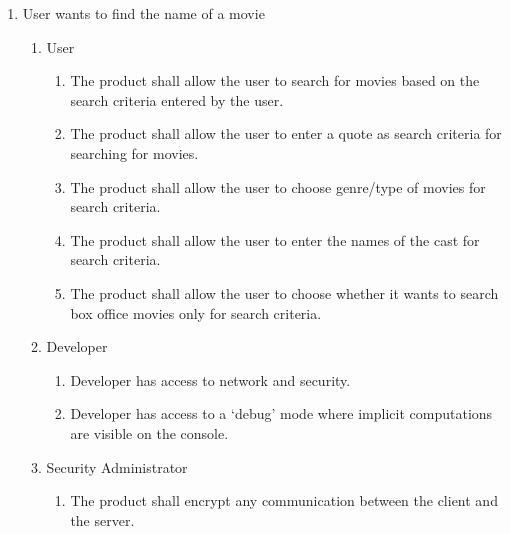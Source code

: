 \documentclass[]{article}
\begin{document}
\begin{enumerate}[{BE}1.]
	
	\item User wants to find the name of a movie
	\begin{enumerate}[{VP1}.1]
		\item User
			\begin{enumerate}
				\item The product shall allow the user to search for movies based on the search criteria entered by the user.
				\item The product shall allow the user to enter a quote as search criteria for searching for movies.
				\item The product shall allow the user to choose genre/type of movies for search criteria.
				\item The product shall allow the user to enter the names of the cast for search criteria.
				\item The product shall allow the user to choose whether it wants to search box office movies only for search criteria.
			\end{enumerate}
		\item Developer
			\begin{enumerate}
				\item Developer has access to network and security.
				\item Developer has access to a ‘debug’ mode where implicit computations are visible on the console.
			\end{enumerate}
		\item Security Administrator
			\begin{enumerate}
				\item The product shall encrypt any communication between the client and the server.
			\end{enumerate}
	\end{enumerate}
	

\end{enumerate}
\end{document}
